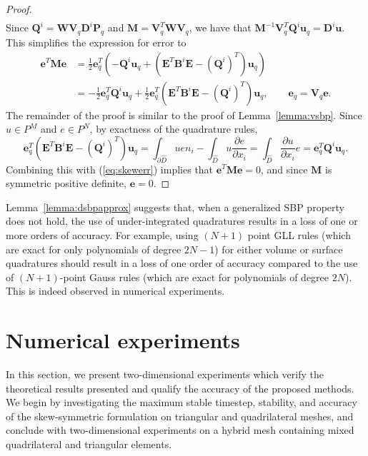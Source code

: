 \documentclass{svjour3}                     %
\renewcommand{\hat}{\widehat}
\newcommand{\pd}[2]{\frac{\partial#1}{\partial#2}}
\newcommand{\LRp}[1]{\left( #1 \right)}
\begin{document}
\begin{proof}
\begin{align*}
\end{align*}
Since $\bm{Q}^i = \bm{W}\bm{V}_q\bm{D}^i\bm{P}_q$ and $\bm{M} = \bm{V}_q^T\bm{W}\bm{V}_q$, we have that $\bm{M}^{-1}\bm{V}_q^T\bm{Q}^i\bm{u}_q = \bm{D}^i\bm{u}$.  This simplifies the expression for error to
\begin{align}
\bm{e}^T\bm{M}\bm{e} &= \frac{1}{2}
\bm{e}_q^T\LRp{-\bm{Q}^i\bm{u}_q + \LRp{\bm{E}^T\bm{B}^i\bm{E} - \LRp{\bm{Q}^i}^T}\bm{u}_q} \label{eq:skewerr}\\
&= -\frac{1}{2}
\bm{e}_q^T\bm{Q}^i\bm{u}_q + \frac{1}{2}\bm{e}_q^T\LRp{\bm{E}^T\bm{B}^i\bm{E} - \LRp{\bm{Q}^i}^T}\bm{u}_q, \qquad \bm{e}_q = \bm{V}_q\bm{e}. \nonumber
\end{align}
The remainder of the proof is similar to the proof of Lemma~\ref{lemma:vsbp}.  Since $u \in P^M$ and $e \in P^N$, by exactness of the quadrature rules, 
\[
\bm{e}_q^T\LRp{\bm{E}^T\bm{B}^i\bm{E} - \LRp{\bm{Q}^i}^T}\bm{u}_q = \int_{\partial \hat{D}} u e n_i - \int_{\hat{D}} u \pd{e}{x_i}
= \int_{\hat{D}} \pd{u}{x_i} e = \bm{e}_q^T\bm{Q}^i\bm{u}_q.
\]
Combining this with (\ref{eq:skewerr}) implies that $\bm{e}^T\bm{M}\bm{e} = 0$, and since $\bm{M}$ is symmetric positive definite, $\bm{e} = 0$.  
\end{proof}

Lemma~\ref{lemma:dsbpapprox} suggests that, when a generalized SBP property does not hold, the use of under-integrated quadratures results in a loss of one or more orders of accuracy.  For example, using $(N+1)$ point GLL rules (which are exact for only polynomials of degree $2N-1$) for either volume or surface quadratures should result in a loss of one order of accuracy compared to the use of $(N+1)$-point Gauss rules (which are exact for polynomials of degree $2N$).  This is indeed observed in numerical experiments.  



\section{Numerical experiments}
\label{sec:num}

In this section, we present two-dimensional experiments which verify the theoretical results presented and qualify the accuracy of the proposed methods.  We begin by investigating the maximum stable timestep, stability, and accuracy of the skew-symmetric formulation on triangular and quadrilateral meshes, and conclude with two-dimensional experiments on a hybrid mesh containing mixed quadrilateral and triangular elements.  
\end{document}
